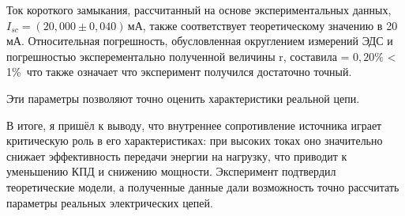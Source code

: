 \documentclass[a4paper]{article}
\begin{document}
Ток короткого замыкания, рассчитанный на основе экспериментальных данных, \(I_{sc} = (20{,}000 \pm 0{,}040)\,\text{мА}\), также соответствует теоретическому значению в 20 мА. Относительная погрешность, обусловленная округлением измерений ЭДС и погрешностью эксперементально полученной величины r, составила \varepsilon = \(0{,}20\%\) < 1\%\, что также означает что эксперимент получился достаточно точный.

Эти параметры позволяют точно оценить характеристики реальной цепи.

В итоге, я пришёл к выводу, что внутреннее сопротивление источника играет критическую роль
в его характеристиках: при высоких токах оно значительно снижает эффективность передачи
энергии на нагрузку, что приводит к уменьшению КПД и снижению мощности.
Эксперимент подтвердил теоретические модели, а полученные данные дали возможность точно
рассчитать параметры реальных электрических цепей.
\end{document}
